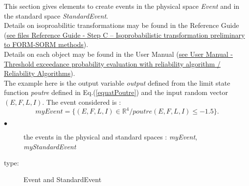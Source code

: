 \renewcommand{\filename}{docUC_ThresholdExceedance_Event.tex}
\renewcommand{\filetitle}{UC : Creation of an event in the physical and the standard spaces}

\HeaderIIILevel

\label{StandardPhysicalEvent}



This section gives elements to create events in the physical space {\itshape Event} and in the standard space {\itshape StandardEvent}.\\



Details on isoproabilitic transformations  may be found in the Reference Guide (\href{OpenTURNS_ReferenceGuide.pdf}{see files Reference Guide - Step C -- Isoprobabilistic transformation preliminary to FORM-SORM methods}).\\


Details on each object may be found in the User Manual  (\href{OpenTURNS_UserManual_TUI.pdf}{see User Manual - Threshold exceedance probability evaluation with reliability algorithm / Reliability Algorithms}).\\



The example here is the output variable {\itshape output} defined from the limit state function {\itshape poutre} defined in  Eq.(\ref{equatPoutre}) and the input random  vector $(E,F,L,I)$. The event considered is :
$$
myEvent = \{ (E,F,L,I) \in \mathbb{R}^4 / poutre(E,F,L,I) \leq -1.5\}.
$$

{
  \begin{description}
  \item[$\bullet$] the events in the physical and standard spaces : {\itshape myEvent}, {\itshape myStandardEvent}
  \item[type:] Event and StandardEvent
  \end{description}
}

